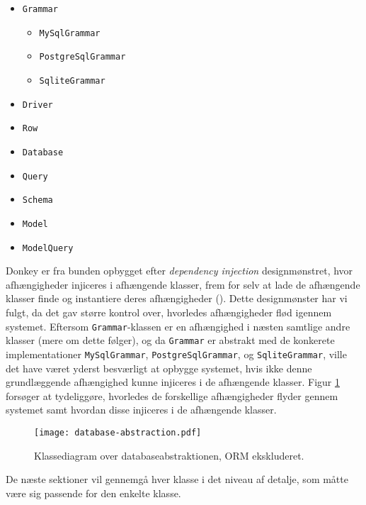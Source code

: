 \begin{multicols}{3}
\begin{itemize}
  \item \texttt{Grammar}
    \begin{itemize}
      \item \texttt{MySqlGrammar}
      \item \texttt{PostgreSqlGrammar}
      \item \texttt{SqliteGrammar}
    \end{itemize}
  \item \texttt{Driver}
  \item \texttt{Row}
  \item \texttt{Database}
  \item \texttt{Query}
  \item \texttt{Schema}
  \item \texttt{Model}
  \item \texttt{ModelQuery}
\end{itemize}
\end{multicols}

Donkey er fra bunden opbygget efter \textit{dependency injection} designmønstret, hvor afhængigheder injiceres i afhængende klasser, frem for selv at lade de afhængende klasser finde og instantiere deres afhængigheder (\cite{wiki:di}). Dette designmønster har vi fulgt, da det gav større kontrol over, hvorledes afhængigheder flød igennem systemet. Eftersom \texttt{Grammar}-klassen er en afhængighed i næsten samtlige andre klasser (mere om dette følger), og da \texttt{Grammar} er abstrakt med de konkerete implementationer \texttt{My\-Sql\-Grammar}, \texttt{Postgre\-Sql\-Grammar}, og \texttt{Sqlite\-Grammar}, ville det have været yderst besværligt at opbygge systemet, hvis ikke denne grundlæggende afhængighed kunne injiceres i de afhængende klasser. Figur \ref{class-diagram:database-abstraction} forsøger at tydeliggøre, hvorledes de forskellige afhængigheder flyder gennem systemet samt hvordan disse injiceres i de afhængende klasser.

\begin{figure}[h]
  \centering
  \texttt{[image: database-abstraction.pdf]}
  \caption{Klassediagram over databaseabstraktionen, ORM ekskluderet.}
  \label{class-diagram:database-abstraction}
\end{figure}

De næste sektioner vil gennemgå hver klasse i det niveau af detalje, som måtte være sig passende for den enkelte klasse.


